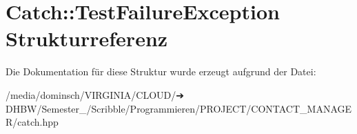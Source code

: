 \hypertarget{structCatch_1_1TestFailureException}{}\section{Catch\+:\+:Test\+Failure\+Exception Strukturreferenz}
\label{structCatch_1_1TestFailureException}


Die Dokumentation für diese Struktur wurde erzeugt aufgrund der Datei\+:\begin{DoxyCompactItemize}
\item 
/media/dominsch/\+V\+I\+R\+G\+I\+N\+I\+A/\+C\+L\+O\+U\+D/➔ D\+H\+B\+W/\+Semester\+\_/\+Scribble/\+Programmieren/\+P\+R\+O\+J\+E\+C\+T/\+C\+O\+N\+T\+A\+C\+T\+\_\+\+M\+A\+N\+A\+G\+E\+R/catch.\+hpp\end{DoxyCompactItemize}
